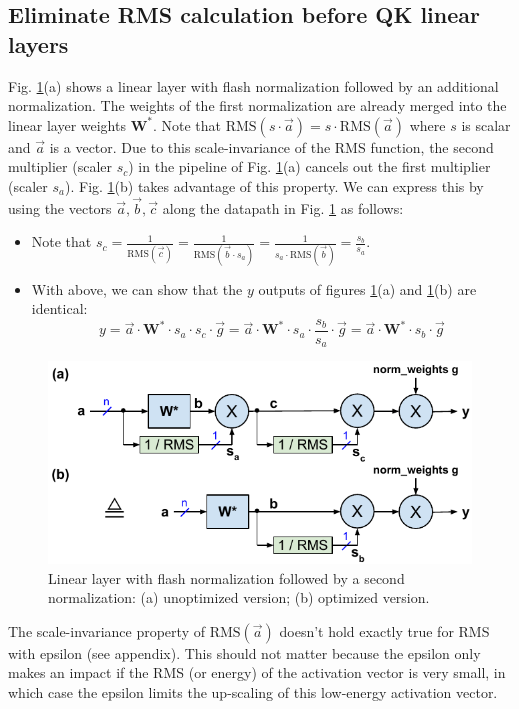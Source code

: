 \documentclass{article}
\newcommand{\mat}[1]{\mathbf{#1}}     %
\newcommand{\RMS}[1]{\text{RMS}(#1)}  %
\def\rms{\text{RMS}(\vec{a})}         %
\def\W*{\mat{W}^\ast}                 %
\def\a{\vec{a}}                       %
\def\b{\vec{b}}                       %
\def\c{\vec{c}}                       %
\def\vg{\vec{g}}                      %
\begin{document}
\subsection{Eliminate RMS calculation before QK linear layers}
Fig. \ref{fig6}(a) shows a linear layer with flash normalization followed by an additional normalization. The weights of the first normalization are already merged into the linear layer weights $\W*$. Note that $\RMS{s \cdot \a} = s \cdot \rms$ where $s$ is scalar and $\a$ is a vector. Due to this scale-invariance of the RMS function, the second multiplier (scaler $s_c$) in the pipeline of Fig. \ref{fig6}(a) cancels out the first multiplier (scaler $s_a$). Fig. \ref{fig6}(b) takes advantage of this property. We can express this by using the vectors $\a, \b, \c$ along the datapath in Fig. \ref{fig6} as follows:
\begin{itemize}[topsep=-1pt]
  \item Note that $s_c = \frac{1}{\RMS{\c}} = \frac{1}{\RMS{\b \cdot s_a}} = \frac{1}{s_a \cdot \RMS{\b}} = \frac{s_b}{s_a}$.
  \item With above, we can show that the $y$ outputs of figures \ref{fig6}(a) and \ref{fig6}(b) are identical:
    \begin{equation*}
      y = \a \cdot \W* \cdot s_a \cdot s_c \cdot \vg = \a \cdot \W* \cdot s_a \cdot \frac{s_b}{s_a} \cdot \vg
      = \a \cdot \W* \cdot s_b \cdot \vg
    \end{equation*}
\end{itemize}

\begin{figure}[h!] \centering
  \includegraphics[scale=0.9]{../doc/fig/flashNorm_fig6.pdf}
  \caption{Linear layer with flash normalization followed by a second normalization: (a) unoptimized version; (b) optimized version.}
\label{fig6} \end{figure}

The scale-invariance property of $\rms$ doesn’t hold exactly true for RMS with epsilon (see appendix). This should not matter because the epsilon only makes an impact if the RMS (or energy) of the activation vector is very small, in which case the epsilon limits the up-scaling of this low-energy activation vector.
\end{document}
